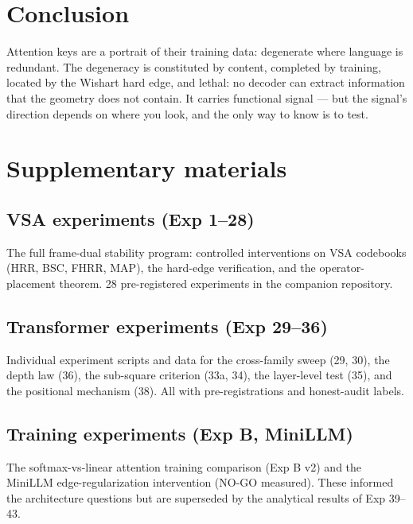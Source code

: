 \documentclass[11pt]{article}
\begin{document}
\section{Conclusion}
Attention keys are a portrait of their training data: degenerate where
language is redundant. The degeneracy is constituted by content,
completed by training, located by the Wishart hard edge, and lethal:
no decoder can extract information that the geometry does not contain.
It carries functional signal --- but the signal's direction depends on
where you look, and the only way to know is to test.

\appendix
\section{Supplementary materials}

\subsection{VSA experiments (Exp 1--28)}
The full frame-dual stability program: controlled interventions on VSA
codebooks (HRR, BSC, FHRR, MAP), the hard-edge verification, and the
operator-placement theorem. 28 pre-registered experiments in the
companion repository.

\subsection{Transformer experiments (Exp 29--36)}
Individual experiment scripts and data for the cross-family sweep (29,
30), the depth law (36), the sub-square criterion (33a, 34), the
layer-level test (35), and the positional mechanism (38). All with
pre-registrations and honest-audit labels.

\subsection{Training experiments (Exp B, MiniLLM)}
The softmax-vs-linear attention training comparison (Exp B v2) and the
MiniLLM edge-regularization intervention (NO-GO measured). These
informed the architecture questions but are superseded by the
analytical results of Exp 39--43.
\end{document}
